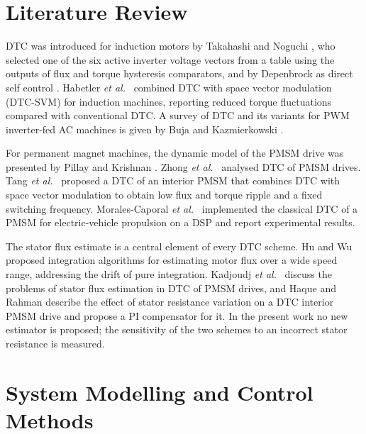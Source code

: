 \documentclass[12pt,a4paper,onecolumn]{IEEEtran}
\begin{document}
\section{Literature Review}
DTC was introduced for induction motors by Takahashi and Noguchi \cite{takahashi1986}, who selected one of the six active inverter voltage vectors from a table using the outputs of flux and torque hysteresis comparators, and by Depenbrock as direct self control \cite{depenbrock1988}. Habetler \emph{et al.}\ \cite{habetler1992} combined DTC with space vector modulation (DTC-SVM) for induction machines, reporting reduced torque fluctuations compared with conventional DTC. A survey of DTC and its variants for PWM inverter-fed AC machines is given by Buja and Kazmierkowski \cite{buja2004}.

For permanent magnet machines, the dynamic model of the PMSM drive was presented by Pillay and Krishnan \cite{pillay1989}. Zhong \emph{et al.}\ \cite{zhong1997} analysed DTC of PMSM drives. Tang \emph{et al.}\ \cite{tang2004} proposed a DTC of an interior PMSM that combines DTC with space vector modulation to obtain low flux and torque ripple and a fixed switching frequency. Morales-Caporal \emph{et al.}\ \cite{morales2018} implemented the classical DTC of a PMSM for electric-vehicle propulsion on a DSP and report experimental results.

The stator flux estimate is a central element of every DTC scheme. Hu and Wu \cite{hu1998} proposed integration algorithms for estimating motor flux over a wide speed range, addressing the drift of pure integration. Kadjoudj \emph{et al.}\ \cite{kadjoudj2007} discuss the problems of stator flux estimation in DTC of PMSM drives, and Haque and Rahman \cite{haque2000} describe the effect of stator resistance variation on a DTC interior PMSM drive and propose a PI compensator for it. In the present work no new estimator is proposed; the sensitivity of the two schemes to an incorrect stator resistance is measured.

\section{System Modelling and Control Methods}
\end{document}
